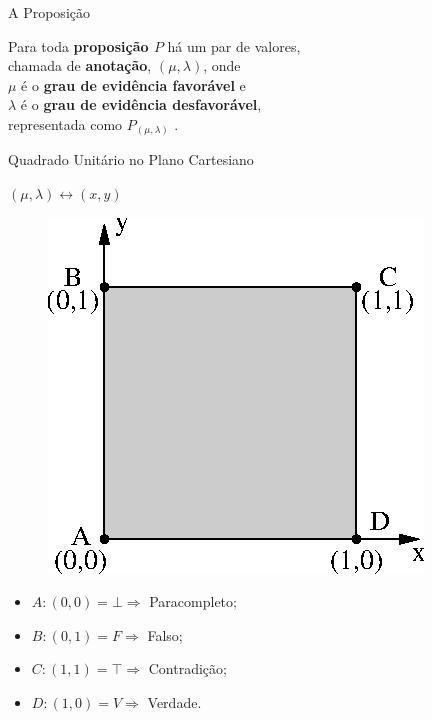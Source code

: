 \begin{frame}{A Proposição}
\vspace{1cm}

\begin{block}{}
\center
Para toda \textbf{proposição $P$} há um par de valores, \\
chamada de \textbf{anotação}, \textbf{$(\mu , \lambda )$}, onde \\
$\mu$ é o \textbf{grau de evidência favorável} e \\
$\lambda $ é o \textbf{grau de evidência desfavorável}, \\
representada como  \textbf{$P_{( \mu , \lambda )}$ }.
\end{block}

\end{frame}


\begin{frame}{Quadrado Unitário no Plano Cartesiano}

\begin{block}{ \centering   $(\mu, \lambda ) \leftrightarrow (x,y) $ } \end{block}
\vspace{1cm}
\begin{minipage}{0.40\linewidth}
\begin{figure}[!htb]
\center\includegraphics[scale=1.0]{./imagens/C422qupc.eps}
\label{fig:reticuladoQUPC}
\end{figure}
\end{minipage}
\begin{minipage}{0.55\linewidth}
\center
\begin{itemize}
\item $A: (0,0) = \bot \Rightarrow $ Paracompleto;
\item $B: (0,1) = F \Rightarrow $ Falso;
\item $C: (1,1) = \top \Rightarrow $ Contradição;
\item $D: (1,0) = V \Rightarrow $ Verdade.
\end{itemize}
\end{minipage}

\end{frame}

